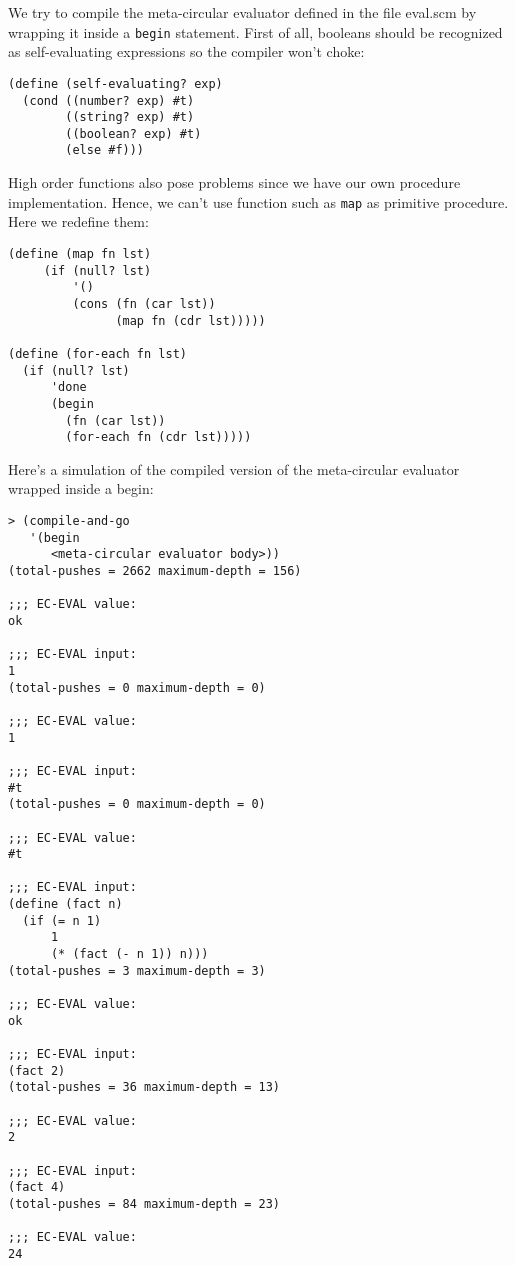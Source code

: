 \documentclass[a4paper,12pt]{article}
\begin{document}
We try to compile the meta-circular evaluator defined in the file
eval.scm by wrapping it inside a \lstinline!begin! statement.  First
of all, booleans should be recognized  as self-evaluating expressions
so the compiler won't choke:
\begin{lstlisting}
(define (self-evaluating? exp)
  (cond ((number? exp) #t)
        ((string? exp) #t)
        ((boolean? exp) #t)
        (else #f)))
\end{lstlisting}

High order functions also pose problems since we have our own
procedure implementation.  Hence, we can't use function such as
\lstinline!map! as primitive procedure.  Here we redefine them:

\begin{lstlisting}
(define (map fn lst)
     (if (null? lst)
         '()
         (cons (fn (car lst))
               (map fn (cdr lst)))))

(define (for-each fn lst)
  (if (null? lst)
      'done
      (begin
        (fn (car lst))
        (for-each fn (cdr lst)))))
\end{lstlisting}

Here's a simulation of the compiled version of the meta-circular
evaluator wrapped inside a begin:

\begin{lstlisting}
> (compile-and-go
   '(begin
      <meta-circular evaluator body>))
(total-pushes = 2662 maximum-depth = 156)

;;; EC-EVAL value:
ok

;;; EC-EVAL input:
1
(total-pushes = 0 maximum-depth = 0)

;;; EC-EVAL value:
1

;;; EC-EVAL input:
#t
(total-pushes = 0 maximum-depth = 0)

;;; EC-EVAL value:
#t

;;; EC-EVAL input:
(define (fact n)
  (if (= n 1)
      1
      (* (fact (- n 1)) n)))
(total-pushes = 3 maximum-depth = 3)

;;; EC-EVAL value:
ok

;;; EC-EVAL input:
(fact 2)
(total-pushes = 36 maximum-depth = 13)

;;; EC-EVAL value:
2

;;; EC-EVAL input:
(fact 4)
(total-pushes = 84 maximum-depth = 23)

;;; EC-EVAL value:
24
\end{lstlisting}
\end{document}
